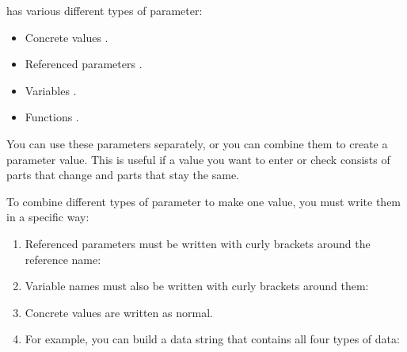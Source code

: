 
\app{} has various different types of parameter:
\begin{itemize}
\item Concrete values .
\item Referenced parameters .
\item Variables .
\item Functions .
\end{itemize}

You can use these parameters separately, or you can combine them to create a parameter value. This is useful if a value you want to enter or check consists of parts that change and parts that stay the same. 

To combine different types of parameter to make one value, you must write them in a specific way:
\begin{enumerate}
\item Referenced parameters must be written with curly brackets around the reference name:\\
\item Variable names must also be written with curly brackets around them:\\
\item Concrete values are written as normal. 
\item For example, you can build a data string that contains all four types of data:\\
\\

\end{enumerate}


